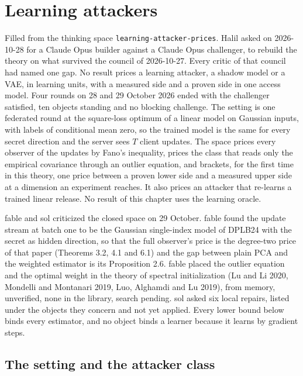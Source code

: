 \chapter{Learning attackers}\label{ch:learning-attackers}
Filled from the thinking space \texttt{learning-attacker-prices}. Halil asked on
2026-10-28 for a Claude Opus builder against a Claude Opus challenger, to rebuild the
theory on what survived the council of 2026-10-27. Every critic of that council had
named one gap. No result prices a learning attacker, a shadow model or a VAE, in
learning units, with a measured side and a proven side in one access model. Four rounds
on 28 and 29 October 2026 ended with the challenger satisfied, ten objects standing and
no blocking challenge. The setting is one federated round at the square-loss optimum of
a linear model on Gaussian inputs, with labels of conditional mean zero, so the trained
model is the same for every secret direction and the server sees $T$ client updates.
The space prices every observer of the updates by Fano's inequality, prices the class
that reads only the empirical covariance through an outlier equation, and brackets, for
the first time in this theory, one price between a proven lower side and a measured
upper side at a dimension an experiment reaches. It also prices an attacker that
re-learns a trained linear release. No result of this chapter uses the learning
oracle.

fable and sol criticized the closed space on 29 October. fable found the update stream
at batch one to be the Gaussian single-index model of DPLB24 with the secret as hidden
direction, so that the full observer's price is the degree-two price of that paper
(Theorems 3.2, 4.1 and 6.1) and the gap between plain PCA and the weighted estimator is
its Proposition 2.6. fable placed the outlier equation and the optimal weight in the
theory of spectral initialization (Lu and Li 2020, Mondelli and Montanari 2019, Luo,
Alghamdi and Lu 2019), from memory, unverified, none in the library, search pending.
sol asked six local repairs, listed under the objects they concern and not yet applied.
Every lower bound below binds every estimator, and no object binds a learner because it
learns by gradient steps.

\section{The setting and the attacker class}

